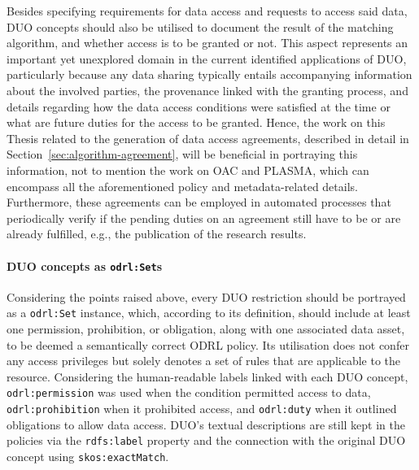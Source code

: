 Besides specifying requirements for data access and requests to access said data, DUO concepts should also be utilised to document the result of the matching algorithm, and whether access is to be granted or not.
This aspect represents an important yet unexplored domain in the current identified applications of DUO, particularly because any data sharing typically entails accompanying information about the involved parties, the provenance linked with the granting process, and details regarding how the data access conditions were satisfied at the time or what are future duties for the access to be granted.
Hence, the work on this Thesis related to the generation of data access agreements, described in detail in Section~\ref{sec:algorithm-agreement}, will be beneficial in portraying this information, not to mention the work on OAC and PLASMA, which can encompass all the aforementioned policy and metadata-related details.
Furthermore, these agreements can be employed in automated processes that periodically verify if the pending duties on an agreement still have to be or are already fulfilled, e.g., the publication of the research results.

\paragraph{DUO concepts as \texttt{odrl:Set}s}
Considering the points raised above, every DUO restriction should be portrayed as a \texttt{odrl:Set} instance, which, according to its definition, should include at least one permission, prohibition, or obligation, along with one associated data asset, to be deemed a semantically correct ODRL policy.
Its utilisation does not confer any access privileges but solely denotes a set of rules that are applicable to the resource.
Considering the human-readable labels linked with each DUO concept, \texttt{odrl:permission} was used when the condition permitted access to data, \texttt{odrl:prohibition} when it prohibited access, and \texttt{odrl:duty} when it outlined obligations to allow data access. 
DUO's textual descriptions are still kept in the policies via the \texttt{rdfs:label} property and the connection with the original DUO concept using \texttt{skos:exactMatch}.

